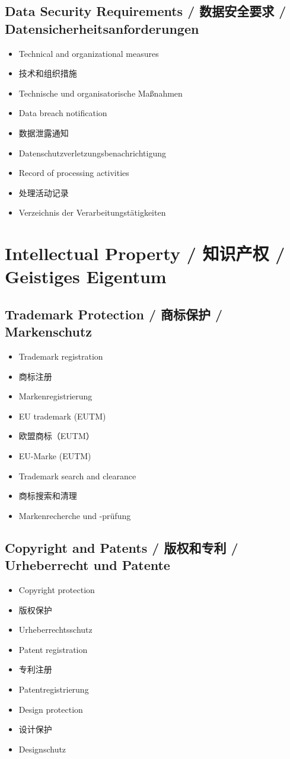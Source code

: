 \subsection{Data Security Requirements / 数据安全要求 / Datensicherheitsanforderungen}
\begin{itemize}
    \item Technical and organizational measures
    \item 技术和组织措施
    \item Technische und organisatorische Maßnahmen
    \item Data breach notification
    \item 数据泄露通知
    \item Datenschutzverletzungsbenachrichtigung
    \item Record of processing activities
    \item 处理活动记录
    \item Verzeichnis der Verarbeitungstätigkeiten
\end{itemize}

\section{Intellectual Property / 知识产权 / Geistiges Eigentum}

\subsection{Trademark Protection / 商标保护 / Markenschutz}
\begin{itemize}
    \item Trademark registration
    \item 商标注册
    \item Markenregistrierung
    \item EU trademark (EUTM)
    \item 欧盟商标（EUTM）
    \item EU-Marke (EUTM)
    \item Trademark search and clearance
    \item 商标搜索和清理
    \item Markenrecherche und -prüfung
\end{itemize}

\subsection{Copyright and Patents / 版权和专利 / Urheberrecht und Patente}
\begin{itemize}
    \item Copyright protection
    \item 版权保护
    \item Urheberrechtsschutz
    \item Patent registration
    \item 专利注册
    \item Patentregistrierung
    \item Design protection
    \item 设计保护
    \item Designschutz
\end{itemize}

